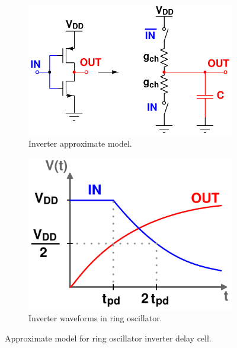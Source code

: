 		\begin{figure}[htb!]
	        \centering
	        \begin{subfigure}{.5\textwidth}
	            \centering
	            \includegraphics[width=\linewidth]{figs/theory/inv_rc_model}
	            \caption{Inverter approximate model.}
	            \label{fig:rosc_3stg_cir}
	        \end{subfigure}%
	        \begin{subfigure}{.5\textwidth}
	            \centering
	            \includegraphics[width=0.8\linewidth]{figs/theory/inv_waves}
	            \caption{Inverter waveforms in ring oscillator.}
	            \label{fig:rosc_3stg_wave}
	        \end{subfigure}
	        \caption{Approximate model for ring oscillator inverter delay cell.}
	        \label{fig:rosc_3stg}
	    \end{figure}

